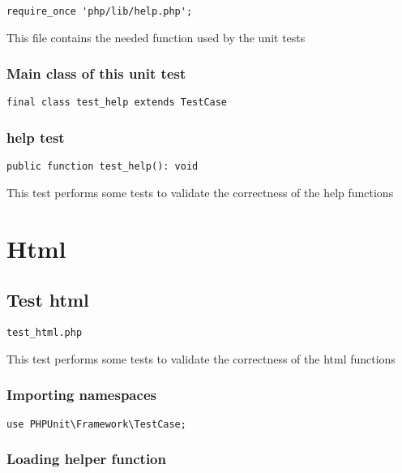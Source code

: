 \documentclass[a4paper]{article}
\begin{document}
\begin{lstlisting}
require_once 'php/lib/help.php';
\end{lstlisting}

This file contains the needed function used by the unit tests

\hypertarget{toc230}{}
\subsubsection{Main class of this unit test}

\begin{lstlisting}
final class test_help extends TestCase
\end{lstlisting}

\hypertarget{toc231}{}
\subsubsection{help test}

\begin{lstlisting}
public function test_help(): void
\end{lstlisting}

This test performs some tests to validate the correctness
of the help functions


\hypertarget{toc232}{}
\section{Html}

\hypertarget{toc233}{}
\subsection{Test html}

\begin{lstlisting}
test_html.php
\end{lstlisting}

This test performs some tests to validate the correctness
of the html functions

\hypertarget{toc234}{}
\subsubsection{Importing namespaces}

\begin{lstlisting}
use PHPUnit\Framework\TestCase;
\end{lstlisting}

\hypertarget{toc235}{}
\subsubsection{Loading helper function}
\end{document}

